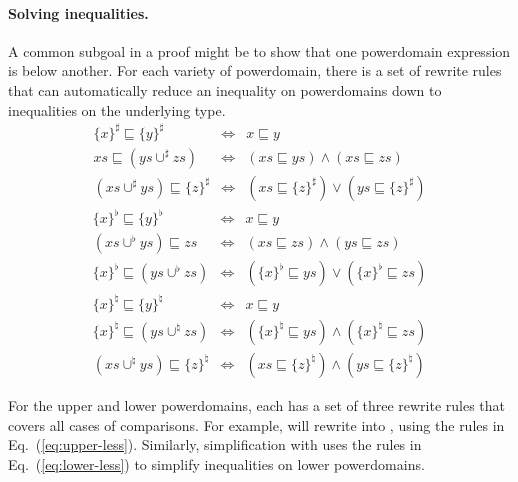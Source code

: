 \paragraph{Solving inequalities.} A common subgoal in a proof might be to show that one powerdomain expression is below another. For each variety of powerdomain, there is a set of rewrite rules that can automatically reduce an inequality on powerdomains down to inequalities on the underlying type.
\begin{eqnarray}
\{x\}^{\sharp}\sqsubseteq\{y\}^{\sharp} & \iff & x\sqsubseteq y\nonumber \\
xs\sqsubseteq(ys\cup^{\sharp}zs) & \iff & (xs\sqsubseteq ys)\wedge(xs\sqsubseteq zs)\label{eq:upper-less}\\
(xs\cup^{\sharp}ys)\sqsubseteq\{z\}^{\sharp} & \iff & (xs\sqsubseteq\{z\}^{\sharp})\vee(ys\sqsubseteq\{z\}^{\sharp})\nonumber
\end{eqnarray}
\begin{eqnarray}
\{x\}^{\flat}\sqsubseteq\{y\}^{\flat} & \iff & x\sqsubseteq y\nonumber \\
(xs\cup^{\flat}ys)\sqsubseteq zs & \iff & (xs\sqsubseteq zs)\wedge(ys\sqsubseteq zs)\label{eq:lower-less}\\
\{x\}^{\flat}\sqsubseteq(ys\cup^{\flat}zs) & \iff & (\{x\}^{\flat}\sqsubseteq ys)\vee(\{x\}^{\flat}\sqsubseteq zs)\nonumber
\end{eqnarray}
\begin{eqnarray}
\{x\}^{\natural}\sqsubseteq\{y\}^{\natural} & \iff & x\sqsubseteq y\nonumber \\
\{x\}^{\natural}\sqsubseteq(ys\cup^{\natural}zs) & \iff & (\{x\}^{\natural}\sqsubseteq ys)\wedge(\{x\}^{\natural}\sqsubseteq zs)\label{eq:convex-less}\\
(xs\cup^{\natural}ys)\sqsubseteq\{z\}^{\natural} & \iff & (xs\sqsubseteq\{z\}^{\natural})\wedge(ys\sqsubseteq\{z\}^{\natural})\nonumber
\end{eqnarray}

For the upper and lower powerdomains, each has a set of three rewrite rules that covers all cases of comparisons. For example,  will rewrite  into , using the rules in Eq.~(\ref{eq:upper-less}). Similarly, simplification with  uses the rules in Eq.~(\ref{eq:lower-less}) to simplify inequalities on lower powerdomains.

